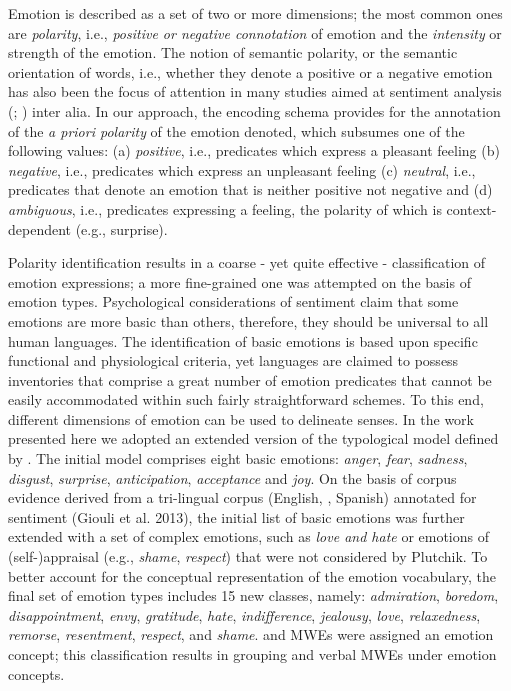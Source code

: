 \documentclass[output=paper]{langsci/langscibook}
\begin{document}
Emotion is described as a set of two or more dimensions; the most common
ones are \textit{polarity}, i.e., \textit{positive
or negative connotation} of emotion and the
\textit{intensity} or strength of the emotion. The notion of
semantic polarity, or the semantic orientation of words, i.e., whether
they denote a positive or a negative emotion has also been the focus of
attention in many studies aimed at sentiment analysis (\citealt{esuli2006}; \citealt{wilson2005}) inter alia. In our approach, the
encoding schema provides for the annotation of the  \textit{a
priori polarity} of the emotion denoted, which subsumes one of the
following values: (a) \textit{positive}, i.e., predicates
which express a pleasant feeling (b) \textit{negative},
i.e., predicates which express an unpleasant feeling (c)
\textit{neutral}, i.e., predicates that denote an emotion
that is neither positive not negative and (d)
\textit{ambiguous}, i.e., predicates expressing a feeling,
the polarity of which is context-dependent (e.g., surprise).



Polarity identification results in a coarse - yet quite effective -
classification of emotion expressions; a more fine-grained one was
attempted on the basis of emotion types. Psychological considerations
of sentiment claim that some emotions are more basic than others,
therefore, they should be universal to all human languages. The
identification of basic emotions is based upon specific functional and
physiological criteria, yet languages are claimed to possess
inventories that comprise a great number of emotion predicates that
cannot be easily accommodated within such fairly straightforward
schemes. To this end, different dimensions of emotion can be used to
delineate senses. In the work presented here we adopted an extended
version of the typological model defined by \cite{plutchik2001}.  The
initial model comprises eight basic emotions:
\textit{anger}, \textit{fear},
\textit{sadness}, \textit{disgust},
\textit{surprise}, \textit{anticipation},
\textit{acceptance} and \textit{joy}. On the
basis of corpus evidence derived from a tri-lingual corpus (English, , Spanish) annotated for sentiment (Giouli et al. 2013), the
initial list of basic emotions was further extended with a set of
complex emotions, such as \textit{love \textup{and }hate} or
emotions of (self-)appraisal (e.g., \textit{shame},
\textit{respect}) that were not considered by Plutchik. To
better account for the conceptual representation of the emotion
vocabulary, the final set of emotion types includes 15 new classes,
namely: \textit{admiration}, \textit{boredom},
\textit{disappointment}, \textit{envy},
\textit{gratitude}, \textit{hate},
\textit{indifference}, \textit{jealousy},
\textit{love}, \textit{relaxedness},
\textit{remorse}, \textit{resentment},
\textit{respect}, and \textit{shame}.  and 
MWEs were assigned an emotion concept; this classification results in
grouping  and  verbal MWEs under emotion concepts.
\end{document}
